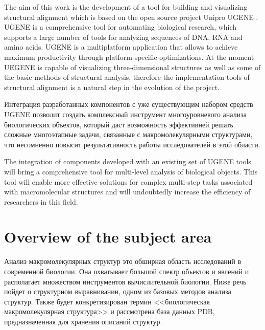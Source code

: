 \documentclass[a4paper, 12pt, titlepage, utf8]{extarticle}
\let\oldsection\section         %
\renewcommand{\section}{\newpage\oldsection}
\begin{document}
The aim of this work is the development of a tool for building and visualizing
structural alignment which is based on the open source project Unipro UGENE
\cite {ugene}. UGENE is a comprehensive tool for automating biological research,
which supports a large number of tools for analyzing sequences of DNA, RNA and
amino acids. UGENE is a multiplatform application that allows to achieve
maximum productivity through platform-specific optimizations. At the moment
UEGENE is capable of visualizing three-dimensional structures as well as some
of the basic methods of structural analysis, therefore the implementation tools
of structural alignment is a natural step in the evolution of the project.

\begin{original}
Интеграция разработанных компонентов с уже существующим набором средств UGENE
позволит создать комплексный инструмент многоуровневого анализа биологических
объектов, который даст возможность эффективней решать сложные многоэтапные
задачи, связанные с макромолекулярными структурами, что несомненно повысит
результативность работы исследователей в этой области.
\end{original}

The integration of components developed with an existing set of UGENE tools will
bring a comprehensive tool for multi-level analysis of biological objects. This
tool will enable more effective solutions for complex multi-step tasks
associated with macromolecular structures and will undoubtedly increase the
efficiency of researchers in this field.



\section{Overview of the subject area}	%
\begin{original}
Анализ макромолекулярных структур это обширная область исследований в
современной биологии. Она охватывает большой спектр объектов и явлений и
располагает множеством инструментов вычислительной биологии. Ниже речь пойдет о
структурном выравнивании, одном из базовых методов анализа структур. Также будет
конкретизирован термин <<биологическая макромолекулярная структура>> и
рассмотрена база данных PDB, предназначенная для хранения описаний структур.
\end{original}
\end{document}
